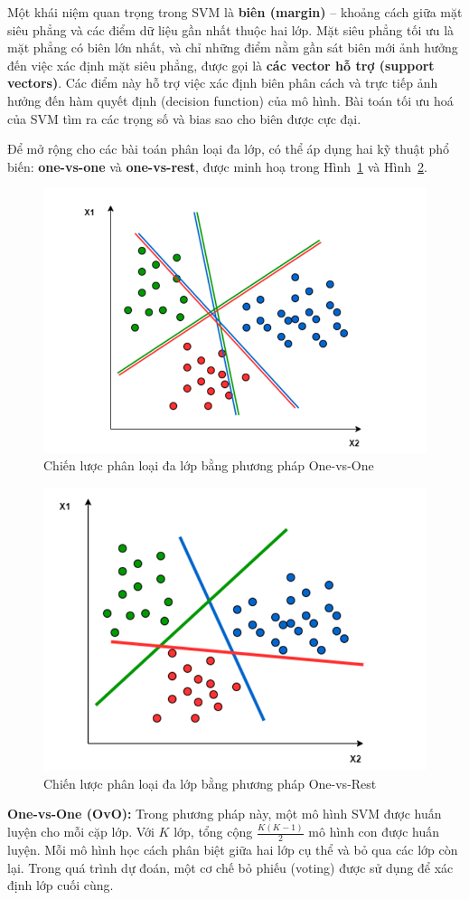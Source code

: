 Một khái niệm quan trọng trong SVM là \textbf{biên (margin)} – khoảng 
cách giữa mặt siêu phẳng và các điểm dữ liệu gần nhất thuộc hai lớp. 
Mặt siêu phẳng tối ưu là mặt phẳng có biên lớn nhất, và chỉ những điểm 
nằm gần sát biên mới ảnh hưởng đến việc xác định mặt siêu phẳng, 
được gọi là \textbf{các vector hỗ trợ (support vectors)}. Các điểm này 
hỗ trợ việc xác định biên phân cách và trực tiếp ảnh hưởng đến hàm 
quyết định (decision function) của mô hình. Bài toán tối ưu hoá của 
SVM tìm ra các trọng số và bias sao cho biên được cực đại.

Để mở rộng cho các bài toán phân loại đa lớp, có thể áp dụng hai kỹ 
thuật phổ biến: \textbf{one-vs-one} và \textbf{one-vs-rest}, được minh 
hoạ trong Hình~\ref{svm_ovso} và Hình~\ref{ovsr}.

\begin{figure}[htbp]
    \centering
    \includegraphics[width=0.6\linewidth]{images/svm_ovso.png}
    \caption{Chiến lược phân loại đa lớp bằng phương pháp One-vs-One}
    \label{svm_ovso}
\end{figure}

\begin{figure}[htbp]
    \centering
    \includegraphics[width=0.6\linewidth]{images/ovsr.png}
    \caption{Chiến lược phân loại đa lớp bằng phương pháp One-vs-Rest}
    \label{ovsr}
\end{figure}

\textbf{One-vs-One (OvO):} Trong phương pháp này, một mô hình SVM được 
huấn luyện cho mỗi cặp lớp. Với $K$ lớp, tổng cộng $\frac{K(K-1)}{2}$ 
mô hình con được huấn luyện. Mỗi mô hình học cách phân biệt giữa hai 
lớp cụ thể và bỏ qua các lớp còn lại. Trong quá trình dự đoán, một cơ 
chế bỏ phiếu (voting) được sử dụng để xác định lớp cuối cùng. 


